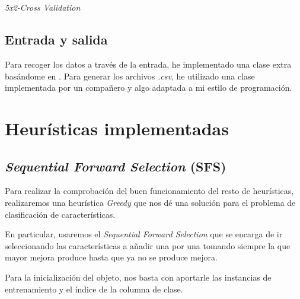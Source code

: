 \documentclass[a4paper, 11pt]{article}
\begin{document}
			\begin{algorithm}[H]
				\begin{algorithmic}[1]
					\REQUIRE \ \\
							 \
							 

										  		
					\ENDFOR
					
				\end{algorithmic}
			\caption{\textit{5x2-Cross Validation}}
			\label{Cross-Validation}
			\end{algorithm}			
			
		\subsection{Entrada y salida}
			Para recoger los datos a través de la entrada, he implementado una clase extra basándome
			en \cite{ARFFReader}.
			Para generar los archivos \textit{.csv}, he utilizado una clase implementada por un
			compañero y algo adaptada a mi estilo de programación.

	\section{Heurísticas implementadas}
		\subsection{\textit{Sequential Forward Selection} (\textbf{SFS})}
			Para realizar la comprobación del buen funcionamiento del resto de heurísticas, realizaremos
			una heurística \textit{Greedy} que nos dé una solución para el problema de clasificación
			de características.
			
			En particular, usaremos el \textit{Sequential Forward Selection} que se encarga de ir
			seleccionando las características a añadir una por una tomando siempre la que mayor mejora
			produce hasta que ya no se produce mejora.
			
			Para la inicialización del objeto, nos basta con aportarle las instancias de entrenamiento
			y el índice de la columna de clase.
			
\end{document}

